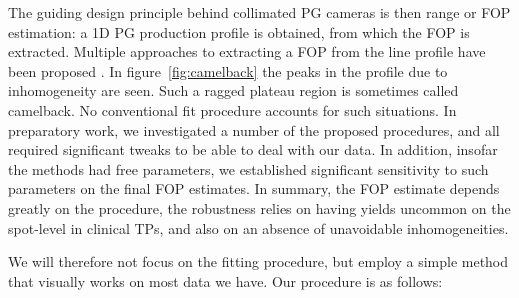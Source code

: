 \documentclass[a4paper,english]{article}
\begin{document}
The guiding design principle behind collimated PG cameras is then range or FOP estimation: a 1D PG production profile is obtained, from which the FOP is extracted. Multiple approaches to extracting a FOP from the line profile have been proposed \citep{Smeets2012,Gueth2013,Roellinghoff2014a,Janssen2014,Sterpin2015}. In figure~\ref{fig:camelback} the peaks in the profile due to inhomogeneity are seen. Such a ragged plateau region is sometimes called camelback. %
No conventional fit procedure accounts for such situations. In preparatory work, we investigated a number of the proposed procedures, and all required significant tweaks to be able to deal with our data. In addition, insofar the methods had free parameters, we established significant sensitivity to such parameters on the final FOP estimates. In summary, the FOP estimate depends greatly on the procedure, the robustness relies on having yields uncommon on the spot-level in clinical TPs, and also on an absence of unavoidable inhomogeneities.

We will therefore not focus on the fitting procedure, but employ a simple method that visually works on most data we have. Our procedure is as follows:
\end{document}

